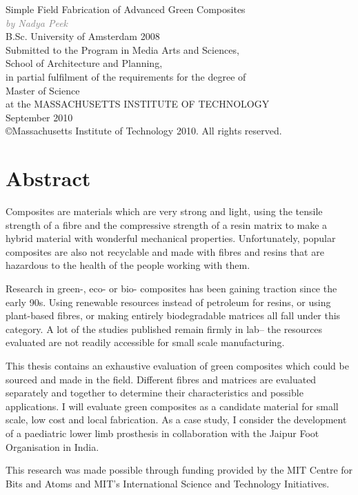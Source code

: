 \documentclass[]{report}
\renewcommand{\emph}[1]{\textit{\textcolor{grey}{#1}}}
\begin{document}
\setlength{\parindent}{0pt}
\setlength{\parskip}{0.3em}




\pagebreak

\Large{
Simple Field Fabrication of Advanced Green Composites  \vspace{10px} \\ 
\emph{by Nadya Peek}\vspace{10px} \\ 
B.Sc. University of Amsterdam 2008} \vspace{20px} \\ 
\large{Submitted to the Program in Media Arts and Sciences,\\
School of Architecture and Planning,\\
in partial fulfilment of the requirements for the degree of\\
Master of Science\\
at the {\sc MASSACHUSETTS INSTITUTE OF TECHNOLOGY}\\
September 2010\\ 
\copyright Massachusetts Institute of Technology 2010. All rights reserved.}\\ \vspace{20px}

\normalsize{
\section*{Abstract}
Composites are materials which are very strong and light, using the tensile strength of a fibre and the compressive strength of a resin matrix to make a hybrid material with wonderful mechanical properties.  Unfortunately, popular composites are also not recyclable and made with fibres and resins that are hazardous to the health of the people working with them.

Research in green-, eco- or bio- composites has been gaining traction since the early 90s.  Using renewable resources instead of petroleum for resins, or using plant-based fibres, or making entirely biodegradable matrices all fall under this category.  A lot of the studies published remain firmly in lab-- the resources evaluated are not readily accessible for small scale manufacturing.

This thesis contains an exhaustive evaluation of green composites which could be sourced and made in the field.  Different fibres and matrices are evaluated separately and together to determine their characteristics and possible applications.  I will evaluate green composites as a candidate material for small scale, low cost and local fabrication.   As a case study, I consider the development of a paediatric lower limb prosthesis in collaboration with the Jaipur Foot Organisation in India.

This research was made possible through funding provided by the MIT Centre for Bits and Atoms and MIT's International Science and Technology Initiatives.
}
\end{document}
